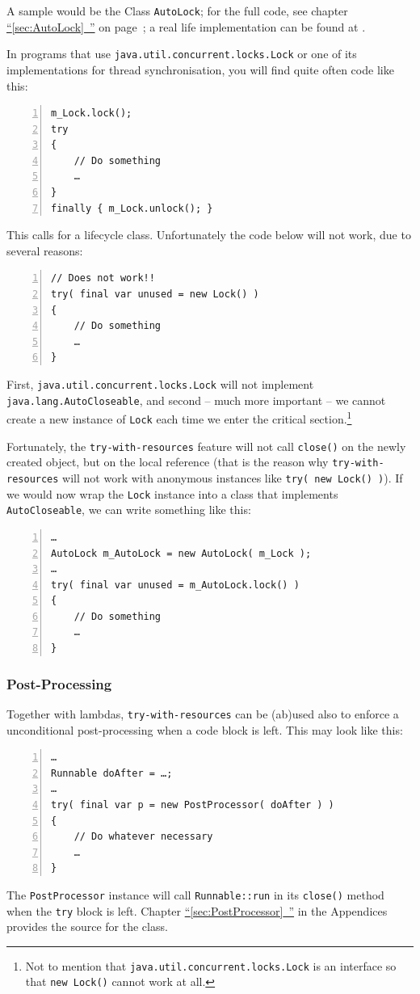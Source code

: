 \documentclass[11pt,a4paper, titlepage, parskip=half, headsepline, footsepline, cleardoublepage=current, headheight=1cm]{scrbook}
\newcommand*{\tqfullref}[1]{\hyperref[{#1}]{“\ref*{#1}~\nameref*{#1}”}}
\newcommand*{\tqfullvref}[1]{\hyperref[{#1}]{“\ref*{#1}~\nameref*{#1}”} on page~\pageref{#1}}
\begin{document}
A sample would be the Class \lstinline|AutoLock|; for the full code, see chapter \tqfullvref{sec:AutoLock}; a real life implementation can be found at \autocite{TQUADRAT_ORG_FOUNDATION_AUTOLOCK}.

In programs that use \lstinline|java.util.concurrent.locks.Lock| or one of its implementations for thread synchronisation, you will find quite often code like this:
\begin{lstlisting}[numbers=left]
m_Lock.lock();
try
{
    // Do something
    …
}
finally { m_Lock.unlock(); }
\end{lstlisting}

This calls for a lifecycle class. Unfortunately the code below will not work, due to several reasons:
\begin{lstlisting}[numbers=left]
// Does not work!!
try( final var unused = new Lock() )
{
    // Do something
    …
}
\end{lstlisting}

First, \lstinline|java.util.concurrent.locks.Lock| will not implement \lstinline|java.lang.AutoCloseable|, and second – much more important – we cannot create a new instance of \lstinline|Lock| each time we enter the critical section.\footnote{Not to mention that \lstinline|java.util.concurrent.locks.Lock| is an interface so that \lstinline|new Lock()| cannot work at all.}

Fortunately, the \lstinline|try-with-resources| feature will not call \lstinline|close()| on the newly created object, but on the local reference (that is the reason why \lstinline|try-with-resources| will not work with anonymous instances like \lstinline|try( new Lock() )|). If we would now wrap the \lstinline|Lock| instance into a class that implements \lstinline|AutoCloseable|, we can write something like this:
\begin{lstlisting}[numbers=left]
…
AutoLock m_AutoLock = new AutoLock( m_Lock );
…
try( final var unused = m_AutoLock.lock() )
{
    // Do something
    …
}
\end{lstlisting}

\subsubsection{Post-Processing}
Together with lambdas, \lstinline|try-with-resources| can be (ab)used also to enforce a unconditional post-processing when a code block is left. This may look like this:
\begin{lstlisting}[numbers=left]
…
Runnable doAfter = …;
…
try( final var p = new PostProcessor( doAfter ) )
{
    // Do whatever necessary
    …
}
\end{lstlisting}
The \lstinline|PostProcessor| instance will call \lstinline|Runnable::run|\autocite{ORACLE_DOC_RUNNABLE:run} in its \lstinline|close()| method when the \lstinline|try| block is left. Chapter \tqfullref{sec:PostProcessor} in the Appendices provides the source for the class.
\end{document}
